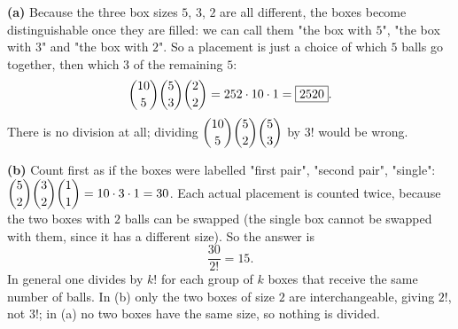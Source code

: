 \textbf{(a)} Because the three box sizes $5$, $3$, $2$ are all different, the boxes become distinguishable once they are filled: we can call them "the box with $5$", "the box with $3$" and "the box with $2$". So a placement is just a choice of which $5$ balls go together, then which $3$ of the remaining $5$:
\[
\dbinom{10}{5}\dbinom{5}{3}\dbinom{2}{2}=252\cdot10\cdot1=\boxed{2520}.
\]
There is no division at all; dividing $\dbinom{10}{5}\dbinom52\dbinom53$ by $3!$ would be wrong.

\textbf{(b)} Count first as if the boxes were labelled "first pair", "second pair", "single": $\dbinom52\dbinom32\dbinom11=10\cdot3\cdot1=30$. Each actual placement is counted twice, because the two boxes with $2$ balls can be swapped (the single box cannot be swapped with them, since it has a different size). So the answer is
\[
\dfrac{30}{2!}=\boxed{15}.
\]
In general one divides by $k!$ for each group of $k$ boxes that receive the same number of balls. In (b) only the two boxes of size $2$ are interchangeable, giving $2!$, not $3!$; in (a) no two boxes have the same size, so nothing is divided.
